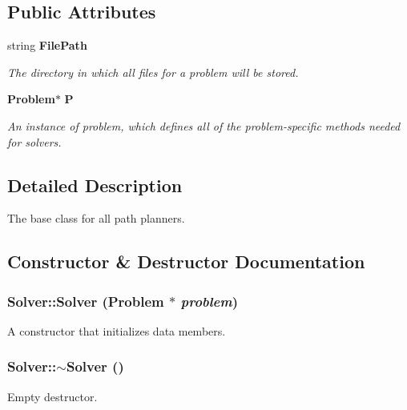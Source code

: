 \subsection*{Public Attributes}
\begin{CompactItemize}
\item 
string {\bf File\-Path}
\begin{CompactList}\small\item\em The directory in which all files for a problem will be stored.\item\end{CompactList}\item 
{\bf Problem}$\ast$ {\bf P}
\begin{CompactList}\small\item\em An instance of problem, which defines all of the problem-specific methods needed for solvers.\item\end{CompactList}\end{CompactItemize}


\subsection{Detailed Description}
The base class for all path planners.



\subsection{Constructor \& Destructor Documentation}
\subsubsection{\setlength{\rightskip}{0pt plus 5cm}Solver::Solver ({\bf Problem} $\ast$ {\em problem})}\label{classSolver_a0}


A constructor that initializes data members.

\subsubsection{\setlength{\rightskip}{0pt plus 5cm}Solver::$\sim$Solver ()\hspace{0.3cm}{\tt  [inline, virtual]}}\label{classSolver_a1}


Empty destructor.



